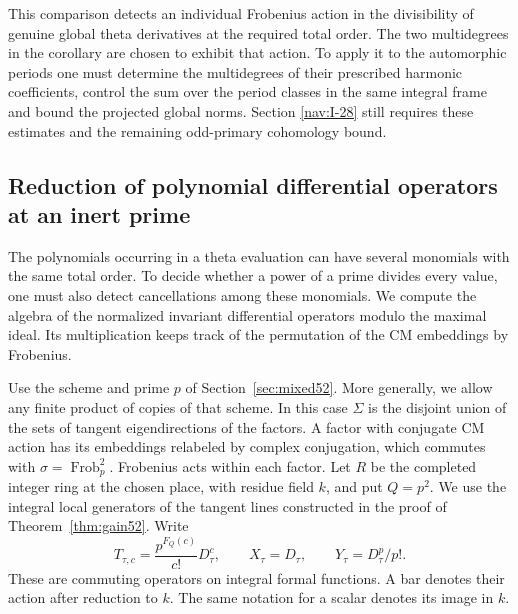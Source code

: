 \documentclass[a4paper,11pt]{article}
\theoremstyle{definition}
\theoremstyle{remark}
\newcommand{\Frob}{\operatorname{Frob}}\newcommand{\Gal}{\operatorname{Gal}}
\numberwithin{equation}{section}
\begin{document}
This comparison detects an individual Frobenius action in the
divisibility of genuine global theta derivatives at the required total
order. The two multidegrees in the corollary are chosen to exhibit
that action. To apply it to the automorphic periods one must determine
the multidegrees of their prescribed harmonic coefficients, control
the sum over the period classes in the same integral frame and bound
the projected global norms. Section \ref{nav:I-28} still requires
these estimates and the remaining odd-primary cohomology bound.

\subsection{Reduction of polynomial differential operators at an inert prime}\label{nav:V-09}
\label{sec:algebra54}

The polynomials occurring in a theta evaluation can have several
monomials with the same total order. To decide whether a power of a
prime divides every value, one must also detect cancellations among
these monomials. We compute the algebra of the normalized invariant
differential operators modulo the maximal ideal. Its multiplication
keeps track of the permutation of the CM embeddings by Frobenius.

Use the scheme and prime \(p\) of Section~\ref{sec:mixed52}. More
generally, we allow any finite product of copies of that scheme.
In this case \(\Sigma\) is the disjoint union of the sets of tangent
eigendirections of the factors. A factor with conjugate CM action
has its embeddings relabeled by complex conjugation, which commutes
with \(\sigma=\Frob_p^2\). Frobenius acts within each factor. Let
\(R\) be the completed integer ring at the chosen place, with
residue field \(k\), and put \(Q=p^2\). We use the integral local
generators of the tangent lines constructed in the proof of
Theorem~\ref{thm:gain52}. Write
\[
 T_{\tau,c}=\frac{p^{F_Q(c)}}{c!}D_\tau^c,\qquad
 X_\tau=D_\tau,\qquad Y_\tau=D_\tau^p/p! .
\]
These are commuting operators on integral formal functions. A bar
denotes their action after reduction to \(k\). The same notation for a
scalar denotes its image in \(k\).
\end{document}
